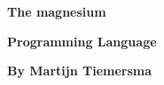 \begin{titlingpage}
    \begin{center}
        \vspace*{\fill}
        \textbf{\HUGE The magnesium}
        
        \bigskip

        \textbf{\Huge Programming Language}

        \vspace*{\fill}

        \textbf{\huge By Martijn Tiemersma}

        \vspace*{\fill}
    \end{center}
\end{titlingpage}
